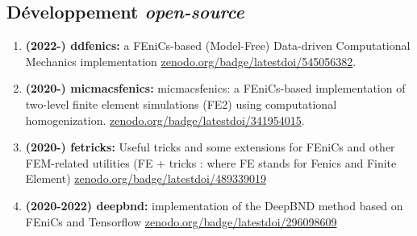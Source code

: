 \documentclass[french]{article}
\begin{document}
\subsection*{Développement \emph{open-source}} \label{sec:libraries}
\begin{enumerate}
	\item \textbf{(2022-) ddfenics:} a FEniCs-based (Model-Free) Data-driven Computational Mechanics implementation \url{zenodo.org/badge/latestdoi/545056382}.
	\item \textbf{(2020-) micmacsfenics:} micmacsfenics: a FEniCs-based implementation of two-level finite element simulations (FE2) using computational homogenization. \url{zenodo.org/badge/latestdoi/341954015}.
	\item \textbf{(2020-) fetricks:} Useful tricks and some extensions for FEniCs and other FEM-related utilities (FE + tricks : where FE stands for Fenics and Finite Element) \url{zenodo.org/badge/latestdoi/489339019}
	\item \textbf{(2020-2022) deepbnd:} implementation of the DeepBND method based on FEniCs and Tensorflow \url{zenodo.org/badge/latestdoi/296098609}
\end{enumerate}
\end{document}

